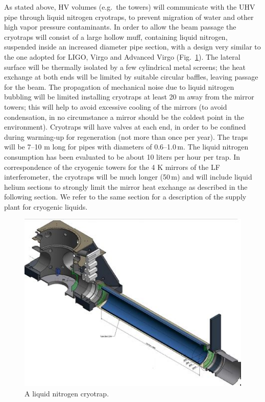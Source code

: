 As stated above, HV volumes (e.g.\ the towers) will communicate with the UHV pipe through liquid nitrogen cryotraps, to prevent migration of water and other high vapor pressure contaminants. In order to allow the beam passage the cryotraps will consist of a large hollow muff, containing liquid nitrogen, suspended inside an increased diameter pipe section, with a design very similar to the one adopted for LIGO, Virgo and Advanced Virgo (Fig.~\ref{fig:vac6}). The lateral surface will be thermally isolated by a few cylindrical metal screens; the heat exchange at both ends will be limited by suitable circular baffles, leaving passage for the beam. The propagation of mechanical noise due to liquid nitrogen bubbling will be limited installing cryotraps at least 20 m away from the mirror towers; this will help to avoid excessive cooling of the mirrors (to avoid condensation, in no circumstance a mirror should be the coldest point in the environment). Cryotraps will have valves at each end, in order to be confined during warming-up for regeneration (not more than once per year). The traps will be 7--10 m long for pipes with diameters of 0.6--1.0\,m. The liquid nitrogen consumption has been evaluated to be about 10 liters per hour per trap. In correspondence of the cryogenic towers for the 4 K mirrors of the LF interferometer, the cryotraps will be much longer (50\,m) and will include liquid helium sections to strongly limit the mirror heat exchange as described in the following section. We refer to the same section for a description of the supply plant for cryogenic liquids.

\begin{figure}
\begin{center}
\includegraphics{Sec_SiteInfra/Figures/VAC6.jpg}
\caption{A liquid nitrogen cryotrap.}
\label{fig:vac6}
\end{center}
\end{figure}


